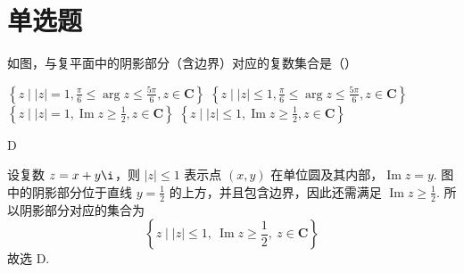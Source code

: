 \section{单选题}
\begin{problem}
如图，与复平面中的阴影部分（含边界）对应的复数集合是（\quad）


\choices
    {\(\left\{z \mid |z| = 1, \frac{\pi}{6} \leqslant \arg z \leqslant \frac{5\pi}{6}, z \in \mathbf{C}\right\}\)}
    {\(\left\{z \mid |z| \leqslant 1, \frac{\pi}{6} \leqslant \arg z \leqslant \frac{5\pi}{6}, z \in \mathbf{C}\right\}\)}
    {\(\left\{z \mid |z| = 1, \operatorname{Im} z \geqslant \frac{1}{2}, z \in \mathbf{C}\right\}\)}
    {\(\left\{z \mid |z| \leqslant 1, \operatorname{Im} z \geqslant \frac{1}{2}, z \in \mathbf{C}\right\}\)}

\begin{answer}
D
\end{answer}

\begin{solution}
设复数 \(z=x+y\i\)，则 \(|z|\leqslant1\) 表示点 \((x,y)\) 在单位圆及其内部，\(\operatorname{Im}z=y\). 图中的阴影部分位于直线 \(y=\frac12\) 的上方，并且包含边界，因此还需满足 \(\operatorname{Im}z\geqslant\frac12\). 所以阴影部分对应的集合为
\[
\left\{z\mid |z|\leqslant1,\ \operatorname{Im}z\geqslant\frac12,\ z\in\mathbf C\right\}
\]
故选 D.
\end{solution}
\end{problem}

